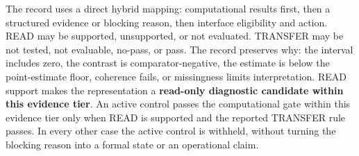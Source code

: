 \documentclass[manuscript,review,anonymous]{acmart}
\begin{document}
The record uses a direct hybrid mapping: computational results first, then a structured evidence or blocking reason, then interface eligibility and action. READ may be supported, unsupported, or not evaluated. TRANSFER may be not tested, not evaluable, no-pass, or pass. The record preserves why: the interval includes zero, the contrast is comparator-negative, the estimate is below the point-estimate floor, coherence fails, or missingness limits interpretation. READ support makes the representation a \textbf{read-only diagnostic candidate within this evidence tier}. An active control passes the computational gate within this evidence tier only when READ is supported and the reported TRANSFER rule passes. In every other case the active control is withheld, without turning the blocking reason into a formal state or an operational claim. {}%
{}%
\end{document}
